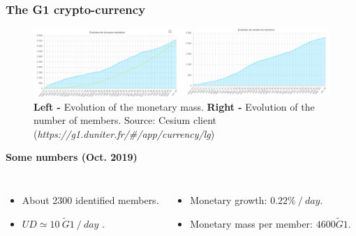 \documentclass{beamer}
\begin{document}
\begin{frame}
	\frametitle{The G1 crypto-currency}
	\begin{figure}
		\includegraphics[width=\linewidth]{./figures/g1_evolution}
		\caption{\textbf{Left -} Evolution of the monetary mass. \textbf{Right -} Evolution of the number of members. Source: Cesium client (\textit{https://g1.duniter.fr/\#/app/currency/lg})}
	\end{figure}
	\smallskip
	\textbf{Some numbers (Oct. 2019)}
	\begin{columns}[c]
		\begin{itemize}
			\item About 2300 identified members.
			\item $UD \simeq 10\ \tilde{G}1\ /\ day$ .
		\end{itemize}
		\begin{itemize}
			\item Monetary growth: $0.22\%\ /\ day$.
			\item Monetary mass per member: $4600 \tilde{G}1 $.
		\end{itemize}
	\end{columns}
\end{frame}

\end{document}
